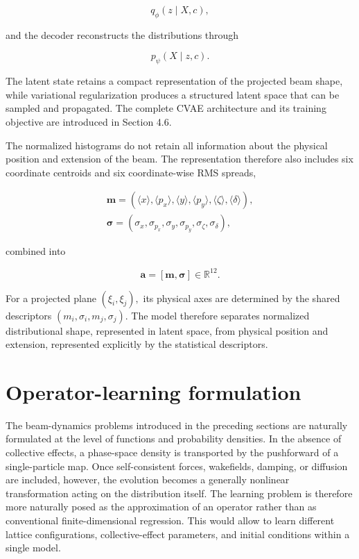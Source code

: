 \begin{equation}
\label{eq:59}
q_{\phi}(z\mid X,c),
\end{equation}

and the decoder reconstructs the distributions through

\begin{equation}
\label{eq:60}
p_{\psi}(X\mid z,c).
\end{equation}

The latent state retains a compact representation of the projected beam shape, while variational regularization produces a structured latent space that can be sampled and propagated. The complete CVAE architecture and its training objective are introduced in Section 4.6.

The normalized histograms do not retain all information about the physical position and extension of the beam. The representation therefore also includes six coordinate centroids and six coordinate-wise RMS spreads,

\begin{equation}
\label{eq:61}
\begin{gathered}\mathbf m=(\langle x\rangle,\langle p_x\rangle,\langle y\rangle,\langle p_y\rangle,\langle\zeta\rangle,\langle\delta\rangle),\\\boldsymbol\sigma=(\sigma_x,\sigma_{p_x},\sigma_y,\sigma_{p_y},\sigma_{\zeta},\sigma_{\delta}),\end{gathered}
\end{equation}

combined into

\begin{equation}
\label{eq:62}
\mathbf a=[\mathbf m,\boldsymbol\sigma]\in\mathbb R^{12}.
\end{equation}

For a projected plane \(( \xi_{i} , \xi_{j} ) ,\) its physical axes are determined by the shared descriptors \(( m_{i} , \sigma_{i} , m_{j} , \sigma_{j} ) .\) The model therefore separates normalized distributional shape, represented in latent space, from physical position and extension, represented explicitly by the statistical descriptors.

\section{Operator-learning formulation}
\label{sec:04_machine_learning_methodology_operator_learning_formulation}

The beam-dynamics problems introduced in the preceding sections are naturally formulated at the level of functions and probability densities. In the absence of collective effects, a phase-space density is transported by the pushforward of a single-particle map. Once self-consistent forces, wakefields, damping, or diffusion are included, however, the evolution becomes a generally nonlinear transformation acting on the distribution itself. The learning problem is therefore more naturally posed as the approximation of an operator rather than as conventional finite-dimensional regression. This would allow to learn different lattice configurations, collective-effect parameters, and initial conditions within a single model.

